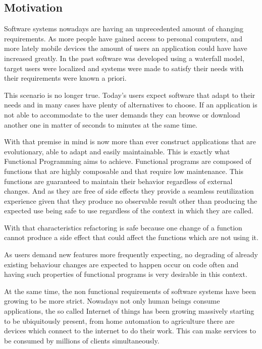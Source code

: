\documentclass[../main.tex]{subfiles}
\begin{document}
\subsection{Motivation}
Software systems nowadays are having an unprecedented amount of changing
requirements. As more people have gained access to personal computers, and more
lately mobile devices the amount of users an application could have have
increased greatly. In the past software was developed using a waterfall model,
target users were localized and systems were made to satisfy their needs with
their requirements were known a priori.

This scenario is no longer true. Today's users expect software that adapt to their
needs and in many cases have plenty of alternatives to choose. If an application
is not able to accommodate to the user demands they can browse or
download another one in matter of seconds to minutes at the same time.

With that premise in mind is now more than ever construct applications that are
evolutionary, able to adapt and easily maintainable. This is exactly what
Functional Programming aims to achieve. Functional programs are composed of
functions that are highly composable and that require low maintenance. This
functions are guaranteed to maintain their behavior regardless of external
changes. And as they are free of side effects they provide a seamless
reutilization experience given that they produce no observable result other than
producing the expected use being safe to use regardless of the context in which
they are called.

With that characteristics refactoring is safe because one change of a function
cannot produce a side effect that could affect the functions which are not using
it.

As users demand new features more frequently expecting, no degrading of already
existing behaviour changes are expected to happen occur on code often and having such
properties of functional programs is very desirable in this context.

At the same time, the non functional requirements of software systems have been
growing to be more strict. Nowadays not only human beings consume applications,
the so called Internet of things has been growing massively starting to be
ubiquitously present, from home automation to agriculture there are devices
which connect to the internet to do their work. This can make services to be
consumed by millions of clients simultaneously.
\end{document}
